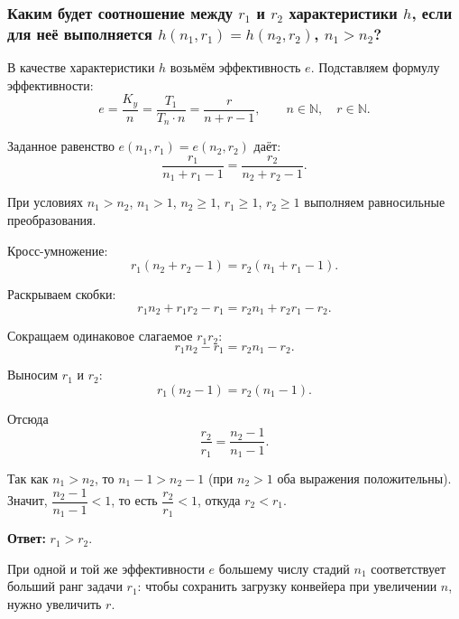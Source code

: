 \subsubsection*{Каким будет соотношение между $r_1$ и $r_2$ характеристики $h$, если для неё выполняется $h(n_1, r_1) = h(n_2, r_2)$, $n_1 > n_2$?}

В качестве характеристики $h$ возьмём эффективность $e$. Подставляем формулу эффективности:
\[
e = \frac{K_y}{n} = \frac{T_1}{T_n \cdot n} = \frac{r}{n + r - 1}, \qquad n \in \mathbb{N},\quad r \in \mathbb{N}.
\]

Заданное равенство $e(n_1, r_1) = e(n_2, r_2)$ даёт:
\[
\frac{r_1}{n_1 + r_1 - 1} = \frac{r_2}{n_2 + r_2 - 1}.
\]

При условиях $n_1 > n_2$, $n_1 > 1$, $n_2 \geq 1$, $r_1 \geq 1$, $r_2 \geq 1$ выполняем равносильные преобразования.

Кросс-умножение:
\[
r_1(n_2 + r_2 - 1) = r_2(n_1 + r_1 - 1).
\]

Раскрываем скобки:
\[
r_1 n_2 + r_1 r_2 - r_1 = r_2 n_1 + r_2 r_1 - r_2.
\]

Сокращаем одинаковое слагаемое $r_1 r_2$:
\[
r_1 n_2 - r_1 = r_2 n_1 - r_2.
\]

Выносим $r_1$ и $r_2$:
\[
r_1(n_2 - 1) = r_2(n_1 - 1).
\]

Отсюда
\[
\frac{r_2}{r_1} = \frac{n_2 - 1}{n_1 - 1}.
\]

Так как $n_1 > n_2$, то $n_1 - 1 > n_2 - 1$ (при $n_2 > 1$ оба выражения положительны). Значит, $\dfrac{n_2 - 1}{n_1 - 1} < 1$, то есть $\dfrac{r_2}{r_1} < 1$, откуда $r_2 < r_1$.

\textbf{Ответ:} $r_1 > r_2$.

При одной и той же эффективности $e$ большему числу стадий $n_1$ соответствует больший ранг задачи $r_1$: чтобы сохранить загрузку конвейера при увеличении $n$, нужно увеличить $r$.
